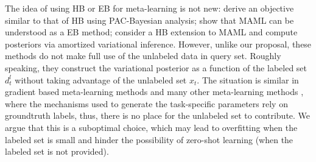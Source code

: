 \documentclass{article} \usepackage{iclr2020_conference,times}
\newcommand{\supp}{l}
\begin{document}
The idea of using HB or EB for meta-learning is not new: \citet{amit2018meta} derive an objective similar to that of HB 
using PAC-Bayesian analysis; \citet{grant2018recasting} show that MAML \citep{finn2017model} can be understood as a EB method;
\citet{ravi2018amortized} consider a HB extension to MAML and compute posteriors via amortized variational inference.
However, unlike our proposal, these methods do not make full use of the unlabeled data in query set. 
Roughly speaking, they construct the variational posterior as a function of the labeled set $d_t^\supp$ without taking advantage of the unlabeled set $x_t$. 
The situation is similar in gradient based meta-learning methods 
\citep{finn2017model,ravi2016optimization,li2017meta,nichol2018first,flennerhag2019transferring} 
and many other meta-learning methods \citep{vinyals2016matching,snell2017prototypical,gidaris2018dynamic}, 
where the mechanisms used to generate the task-specific parameters 
rely on groundtruth labels, thus, there is no place for the unlabeled set to contribute. 
We argue that this is a suboptimal choice,
which may lead to overfitting when the labeled set is small
and hinder the possibility of zero-shot learning (when the labeled set is not provided).
\end{document}
